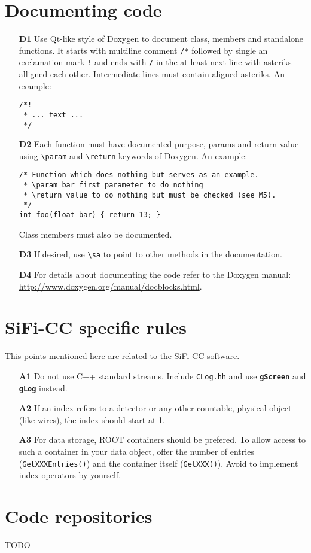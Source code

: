 \documentclass[a4paper,10pt]{article}
\newcommand{\sificc}{SiFi-CC\xspace}
\begin{document}
\section{Documenting code}

\begin{itemize}
  \item[\bf D1] Use Qt-like style of Doxygen to document class, members and
    standalone functions. It starts with multiline comment {\tt /*} followed by
    single an exclamation mark {\tt !} and ends with {\tt */} in the at least
    next line with asteriks {\tt *} alligned each other. Intermediate lines must
    contain aligned asteriks. An example:
    \begin{verbatim}
/*!
 * ... text ...
 */
    \end{verbatim}
  \item[\bf D2] Each function must have documented purpose, params and return
    value using {\tt \textbackslash{}param} and {\tt \textbackslash{}return}
    keywords of Doxygen. An example:
    \begin{verbatim}
/* Function which does nothing but serves as an example.
 * \param bar first parameter to do nothing
 * \return value to do nothing but must be checked (see M5).
 */
int foo(float bar) { return 13; }
    \end{verbatim}
    Class members must also be documented.
  \item[\bf D3] If desired, use {\tt \textbackslash{}sa} to point to other
    methods in the documentation.
  \item[\bf D4] For details about documenting the code refer to the Doxygen
    manual: \url{http://www.doxygen.org/manual/docblocks.html}.
\end{itemize}


\section{\sificc specific rules}

This points mentioned here are related to the \sificc software.

\begin{itemize}
\item[\bf A1] Do not use C++ standard streams. Include {\tt CLog.hh} and use
  {\tt\bf gScreen} and {\bf\tt gLog} instead.
\item[\bf A2] If an index refers to a detector or any other countable, physical
  object (like wires), the index should start at 1.
\item[\bf A3] For data storage, ROOT containers should be prefered. To allow
 access to such a container in your data object, offer the number
 of entries ({\tt GetXXXEntries()}) and the container itself
({\tt GetXXX()}). Avoid to implement index operators by yourself.
\end{itemize}

\section{Code repositories}\label{sec:repos}

TODO
\end{document}
